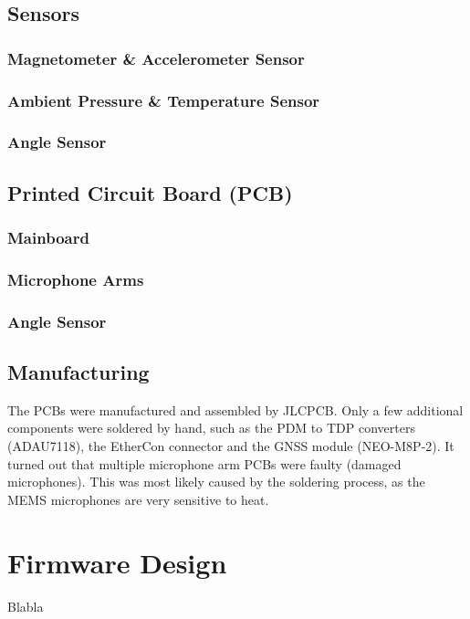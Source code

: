 \subsection{Sensors}

\subsubsection{Magnetometer \& Accelerometer Sensor}

\subsubsection{Ambient Pressure \& Temperature Sensor}

\subsubsection{Angle Sensor}

\subsection{Printed Circuit Board (PCB)}

\subsubsection{Mainboard}

\subsubsection{Microphone Arms}

\subsubsection{Angle Sensor}

\subsection{Manufacturing}
The PCBs were manufactured and assembled by JLCPCB.
Only a few additional components were soldered by hand, such as the PDM to TDP converters (ADAU7118), the EtherCon connector and the GNSS module (NEO-M8P-2).
It turned out that multiple microphone arm PCBs were faulty (damaged microphones).
This was most likely caused by the soldering process, as the MEMS microphones are very sensitive to heat.

\newpage
\section{Firmware Design}
Blabla

